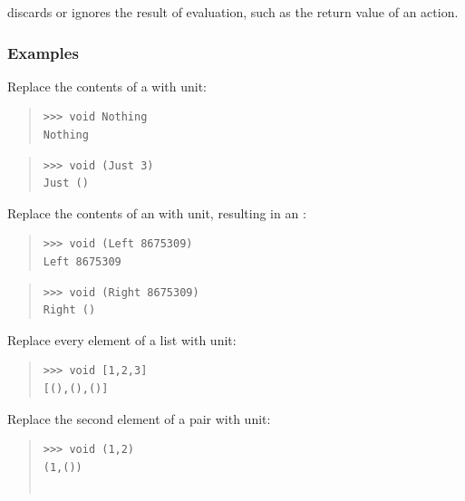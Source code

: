 \begin{haddockdesc}
\item[\begin{tabular}{@{}l}
void :: Functor f => f a -> f ()
\end{tabular}]
{\haddockbegindoc
{} discards or ignores the result of evaluation, such
 as the return value of an  action.\par
\subsubsection*{\textbf{Examples}}
Replace the contents of a  with unit:\par
\begin{quote}
{\haddockverb\begin{verbatim}
>>> void Nothing
Nothing

\end{verbatim}}
\end{quote}
\begin{quote}
{\haddockverb\begin{verbatim}
>>> void (Just 3)
Just ()

\end{verbatim}}
\end{quote}
Replace the contents of an 
 with unit, resulting in an :\par
\begin{quote}
{\haddockverb\begin{verbatim}
>>> void (Left 8675309)
Left 8675309

\end{verbatim}}
\end{quote}
\begin{quote}
{\haddockverb\begin{verbatim}
>>> void (Right 8675309)
Right ()

\end{verbatim}}
\end{quote}
Replace every element of a list with unit:\par
\begin{quote}
{\haddockverb\begin{verbatim}
>>> void [1,2,3]
[(),(),()]

\end{verbatim}}
\end{quote}
Replace the second element of a pair with unit:\par
\begin{quote}
{\haddockverb\begin{verbatim}
>>> void (1,2)
(1,())


\end{verbatim}}
\end{quote}}
\end{haddockdesc}
